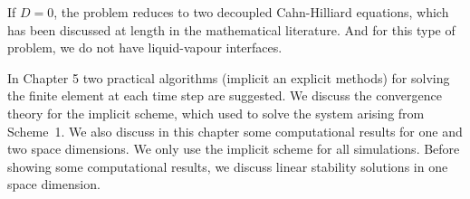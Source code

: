 If $D=0$, the problem reduces to two decoupled Cahn-Hilliard equations, which has
been discussed at length in the mathematical literature.  And for this type of problem, we do not have
liquid-vapour interfaces.

In Chapter 5 two practical algorithms (implicit an explicit methods)
for solving the finite element at each time step are suggested.    We
discuss the convergence theory for the implicit scheme, which used to
solve the system arising from Scheme~1.   We also discuss  in this
chapter some computational results for one and two space dimensions.
We only use the implicit scheme for all simulations. Before showing
some computational results, we discuss linear stability solutions in
one space dimension.
















